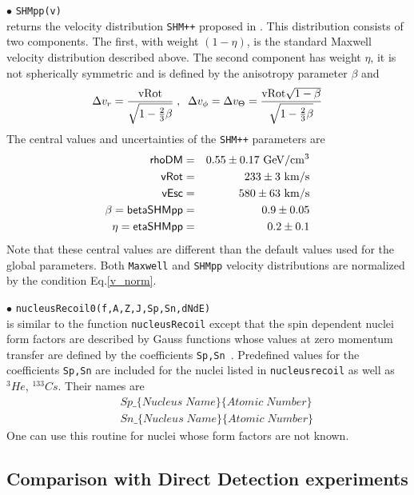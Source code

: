 \documentclass[12pt,a4paper]{article}
\begin{document}
\noindent
$\bullet$ \verb|SHMpp(v)|\\
returns the  velocity distribution {\tt SHM++}  proposed in \cite{Evans:2018bqy}.
This distribution consists of two components. The first, with weight  $(1-\eta)$,  
is  the standard Maxwell velocity distribution described above.   The second component has weight $\eta$, it  is not spherically symmetric and is defined by the
anisotropy parameter $\beta$ and
\begin{equation}
\Delta v_r= \frac{\rm{vRot}}{\sqrt{1-\frac{2}{3}\beta}}\;,\;\; \Delta v_\phi=\Delta v_\Theta=\frac{\rm{vRot} \sqrt{1-\beta}}{\sqrt{1-\frac{2}{3}\beta}} 
\end{equation}    
The central values  and uncertainties   of   the {\tt SHM++} parameters are 
\begin{eqnarray} 
\textsf{rhoDM} &=&0.55\pm 0.17 ~{\rm GeV}/{\rm cm}^3\\
\textsf{vRot}&=& 233\pm 3 ~{\rm km/s}\\
\textsf{vEsc}&=& 580\pm 63~ {\rm km/s}\\
 \beta=\textsf{betaSHMpp} &=&0.9\pm 0.05\\
\eta= \textsf{etaSHMpp} &=& 0.2\pm 0.1  
\end{eqnarray}
\noindent
Note that these central values are different than the default values used for the global parameters. Both {\tt Maxwell} and {\tt SHMpp} velocity distributions are normalized by the condition
Eq.\ref{v_norm}. 

\noindent
$\bullet$ \verb|nucleusRecoil0(f,A,Z,J,Sp,Sn,dNdE)|\\
is similar to the  function \verb|nucleusRecoil| except that 
the spin dependent nuclei form factors are described by Gauss functions
whose values  at zero momentum transfer are defined by the coefficients \verb|Sp,Sn|~\cite{Belanger:2008sj}. 
Predefined values for the coefficients \verb|Sp,Sn| are included for the
nuclei listed in \verb|nucleusrecoil| as well as ${}^3He$, ${}^{133}Cs$. Their  names are 
\begin{eqnarray}
    &&Sp\_\{Nucleus\; Name\}\{Atomic \;Number\} \nonumber\\
    &&Sn\_\{Nucleus\; Name\}\{Atomic\; Number\} \nonumber
\end{eqnarray}
One can use this routine for nuclei whose form factors  are not known. 



\subsection{ Comparison with Direct Detection experiments} 
\label{DDexp}
\end{document}
